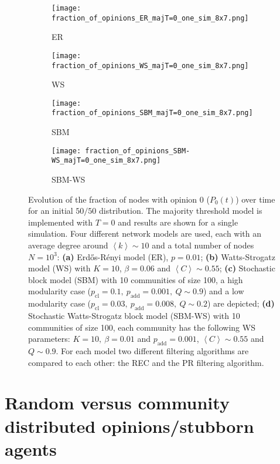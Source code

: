 \documentclass[11 pt , letterpaper , twoside , openright]{book}
\begin{document}
\begin{figure}[H]
  \begin{subfigure}[b]{0.49\textwidth}
  	\texttt{[image: fraction\_of\_opinions\_ER\_majT=0\_one\_sim\_8x7.png]}
    \caption{ER}
    \label{er_majT}
  \end{subfigure}
  \begin{subfigure}[b]{0.49\textwidth}
  	\texttt{[image: fraction\_of\_opinions\_WS\_majT=0\_one\_sim\_8x7.png]}
    \caption{WS}
    \label{ws_majT}
  \end{subfigure}
  \begin{subfigure}[b]{0.49\textwidth}
    \texttt{[image: fraction\_of\_opinions\_SBM\_majT=0\_one\_sim\_8x7.png]}
    \caption{SBM}
    \label{sbm_majT}
  \end{subfigure}
  \begin{subfigure}[b]{0.49\textwidth}
    \texttt{[image: fraction\_of\_opinions\_SBM-WS\_majT=0\_one\_sim\_8x7.png]}
    \caption{SBM-WS}
    \label{sbm-ws_majT}
  \end{subfigure}
  \captionsetup{format=plain}
  \caption[Evolution of the fraction of nodes with opinion 0 ($P_0(t)$) over time for an initial $50/50$ opinion distribution. Results for one simulation of the majority threshold model with $T=0$.]{Evolution of the fraction of nodes with opinion 0 ($P_0(t)$) over time for an initial $50/50$ distribution. The majority threshold model is implemented with $T=0$ and results are shown for a single simulation. Four different network models are used, each with an average degree around $\left<k\right> \sim 10$ and a total number of nodes $N = 10^3$: \textbf{(a)} Erd\H{o}s-R\'{e}nyi model (ER), $p=0.01$; \textbf{(b)} Watts-Strogatz model (WS) with $K = 10$, $\beta = 0.06$ and $\left<C\right> \sim 0.55$; \textbf{(c)} Stochastic block model (SBM) with 10 communities of size 100, a high modularity case ($p_{\text{cl}} = 0.1,\ p_{\text{add}} = 0.001,\ Q \sim 0.9$) and a low modularity case ($p_{\text{cl}} = 0.03,\ p_{\text{add}} = 0.008,\ Q \sim 0.2$) are depicted; \textbf{(d)} Stochastic Watts-Strogatz block model (SBM-WS) with 10 communities of size 100, each community has the following WS parameters: $K = 10,\ \beta = 0.01$ and $p_{\text{add}} = 0.001$, $\left<C\right> \sim 0.55$ and $Q \sim 0.9$. For each model two different filtering algorithms are compared to each other: the REC and the PR filtering algorithm.}
\label{ev_op_majT_one_sim}
\end{figure}
\newpage
\section{Random versus community distributed opinions/stubborn agents}
\end{document}
